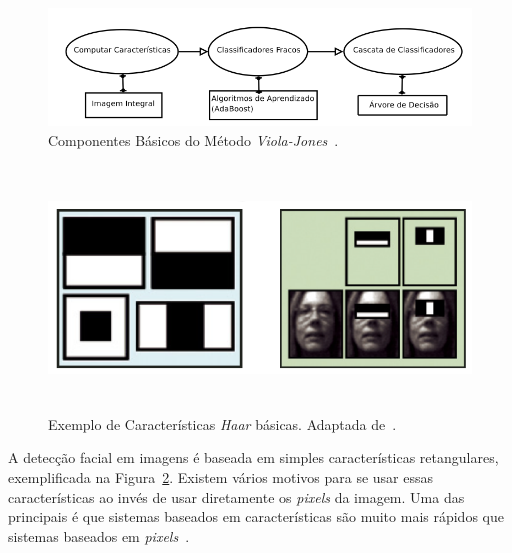 	\begin{figure}[hbt]
		\begin{center}
			\includegraphics[scale=0.5]{figuras/2.FundamentacaoTeorica/edsonma.png}
		\end{center}
		\caption{Componentes Básicos do Método \textit{Viola-Jones}~\cite{edsonma}.}
		\label{fig:edsonma}
	\end{figure}

	\begin{figure}[hbt]
		\begin{center}
			\includegraphics[height=6.5cm,width=12.5cm]{figuras/2.FundamentacaoTeorica/haar_features.png}
		\end{center}
		\caption{Exemplo de Características \textit{Haar} básicas. Adaptada de~\cite{servodetection}.}
		\label{haarfeatures}
	\end{figure}

A detecção facial em imagens é baseada em simples características retangulares, exemplificada na Figura~\ref{haarfeatures}. Existem vários motivos para se usar essas características ao invés de usar diretamente os \textit{pixels} da imagem. Uma das principais é que sistemas baseados em características são muito mais rápidos que sistemas baseados em \textit{pixels}~\cite{violajones}. 

